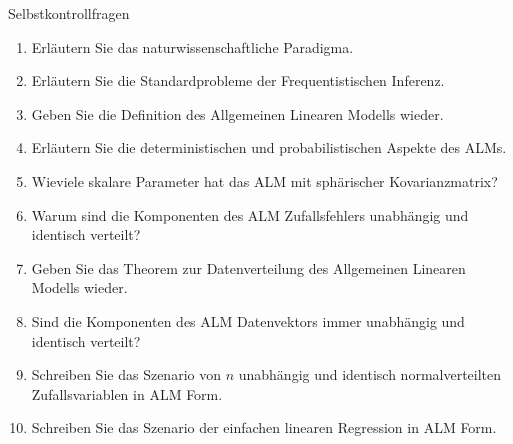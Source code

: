 \documentclass[
  8pt,
  ignorenonframetext,
]{beamer}
\providecommand{\tightlist}{%
  \setlength{\itemsep}{0pt}\setlength{\parskip}{0pt}}
\begin{document}
\begin{frame}{Selbstkontrollfragen}
\protect\hypertarget{selbstkontrollfragen}{}
\footnotesize
{}

\begin{enumerate}
\tightlist
\item
  Erläutern Sie das naturwissenschaftliche Paradigma.
\item
  Erläutern Sie die Standardprobleme der Frequentistischen Inferenz.
\item
  Geben Sie die Definition des Allgemeinen Linearen Modells wieder.
\item
  Erläutern Sie die deterministischen und probabilistischen Aspekte des
  ALMs.
\item
  Wieviele skalare Parameter hat das ALM mit sphärischer
  Kovarianzmatrix?
\item
  Warum sind die Komponenten des ALM Zufallsfehlers unabhängig und
  identisch verteilt?
\item
  Geben Sie das Theorem zur Datenverteilung des Allgemeinen Linearen
  Modells wieder.
\item
  Sind die Komponenten des ALM Datenvektors immer unabhängig und
  identisch verteilt?
\item
  Schreiben Sie das Szenario von \(n\) unabhängig und identisch
  normalverteilten Zufallsvariablen in ALM Form.
\item
  Schreiben Sie das Szenario der einfachen linearen Regression in ALM
  Form.
\end{enumerate}
\end{frame}
\end{document}
